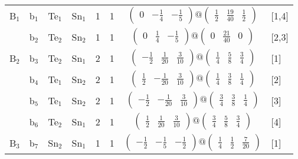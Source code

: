 \documentclass[fleqn,10pt,landscape]{article}
\begin{document}
\begin{itemize}
\begin{center}
\begin{longtable}{cc|cc|c|c|c|l}
B$_{1}$ & b$_{1}$ & Te$_{1}$ & Sn$_{1}$ & 1 & 1 & $\begin{pmatrix} 0 & - \frac{1}{4} & - \frac{1}{5} \end{pmatrix}@\begin{pmatrix} \frac{1}{2} & \frac{19}{40} & \frac{1}{2} \end{pmatrix}$ & [1,4] \\
& b$_{2}$ & Te$_{2}$ & Sn$_{2}$ & 1 & 1 & $\begin{pmatrix} 0 & \frac{1}{4} & - \frac{1}{5} \end{pmatrix}@\begin{pmatrix} 0 & \frac{21}{40} & 0 \end{pmatrix}$ & [2,3] \\ \hline
B$_{2}$ & b$_{3}$ & Te$_{2}$ & Sn$_{1}$ & 2 & 1 & $\begin{pmatrix} - \frac{1}{2} & \frac{1}{20} & \frac{3}{10} \end{pmatrix}@\begin{pmatrix} \frac{1}{4} & \frac{5}{8} & \frac{3}{4} \end{pmatrix}$ & [1] \\
& b$_{4}$ & Te$_{1}$ & Sn$_{2}$ & 2 & 1 & $\begin{pmatrix} \frac{1}{2} & - \frac{1}{20} & \frac{3}{10} \end{pmatrix}@\begin{pmatrix} \frac{1}{4} & \frac{3}{8} & \frac{1}{4} \end{pmatrix}$ & [2] \\
& b$_{5}$ & Te$_{1}$ & Sn$_{2}$ & 2 & 1 & $\begin{pmatrix} - \frac{1}{2} & - \frac{1}{20} & \frac{3}{10} \end{pmatrix}@\begin{pmatrix} \frac{3}{4} & \frac{3}{8} & \frac{1}{4} \end{pmatrix}$ & [3] \\
& b$_{6}$ & Te$_{2}$ & Sn$_{1}$ & 2 & 1 & $\begin{pmatrix} \frac{1}{2} & \frac{1}{20} & \frac{3}{10} \end{pmatrix}@\begin{pmatrix} \frac{3}{4} & \frac{5}{8} & \frac{3}{4} \end{pmatrix}$ & [4] \\ \hline
B$_{3}$ & b$_{7}$ & Sn$_{2}$ & Sn$_{1}$ & 1 & 1 & $\begin{pmatrix} - \frac{1}{2} & - \frac{1}{5} & - \frac{1}{2} \end{pmatrix}@\begin{pmatrix} \frac{1}{4} & \frac{1}{2} & \frac{7}{20} \end{pmatrix}$ & [1] \\

\end{longtable}
\end{center}
\end{itemize}
\end{document}

